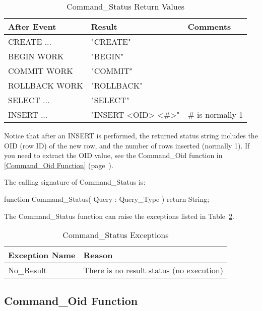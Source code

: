 \documentclass[english,letterpaper]{book}
\newcommand\Ref[1]{\textsection\ref{#1} (page~\pageref{#1})}
\begin{document}
\begin{table}
   \begin{center}
      \begin{tabular}{|l|l|l|}
         \hline
         After Event    &  Result               &  Comments\\
         \hline
         CREATE ...     &  "CREATE"             &  \\
         BEGIN WORK     &  "BEGIN"              &  \\
         COMMIT WORK    &  "COMMIT"             &  \\
         ROLLBACK WORK  &  "ROLLBACK"           &  \\
         SELECT ...     &  "SELECT"             &  \\
         INSERT ...     &  "INSERT <OID> <\#>"  &  \# is normally 1\\
         \hline
      \end{tabular}
   \end{center}
   \caption{Command\_Status Return Values}\label{t:csrv}
\end{table}

Notice that after an INSERT is performed, the returned status string
includes the OID (row ID) of the new row, and the number of rows inserted
(normally 1). If you need to extract the OID value, see the Command\_Oid
function in \Ref{Command_Oid Function}.

The calling signature of Command\_Status is:

\begin{Code}
function Command_Status(
   Query : Query_Type
) return String;
\end{Code}

The Command\_Status function can raise the exceptions listed in
Table~\ref{t:cstsx}.

\begin{table}
   \begin{center}
      \begin{tabular}{ll}
         Exception Name    &  Reason\\
         \hline 
         No\_Result        &  There is no result status (no execution)\\
      \end{tabular}
   \end{center}
   \caption{Command\_Status Exceptions}\label{t:cstsx}
\end{table}


\subsection{Command\_Oid Function \label{Command_Oid Function}}
\end{document}
